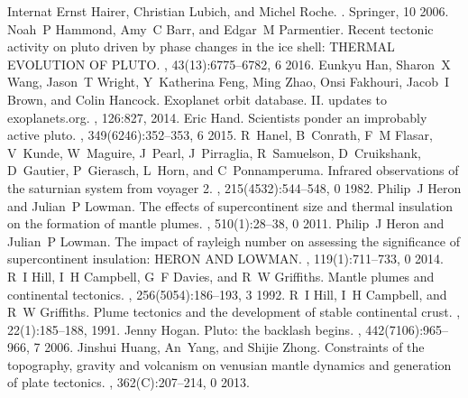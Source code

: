 \documentclass[letterpaper,10pt,english]{jupyterBook}
\begin{document}
\begin{sphinxthebibliography}{Internat}
\sphinxAtStartPar
Ernst Hairer, Christian Lubich, and Michel Roche. . Springer, 10 2006.
\sphinxAtStartPar
Noah P Hammond, Amy C Barr, and Edgar M Parmentier. Recent tectonic activity on pluto driven by phase changes in the ice shell: THERMAL EVOLUTION OF PLUTO. , 43(13):6775–6782, 6 2016.
\sphinxAtStartPar
Eunkyu Han, Sharon X Wang, Jason T Wright, Y Katherina Feng, Ming Zhao, Onsi Fakhouri, Jacob I Brown, and Colin Hancock. Exoplanet orbit database. II. updates to exoplanets.org. , 126:827, 2014.
\sphinxAtStartPar
Eric Hand. Scientists ponder an improbably active pluto. , 349(6246):352–353, 6 2015.
\sphinxAtStartPar
R Hanel, B Conrath, F M Flasar, V Kunde, W Maguire, J Pearl, J Pirraglia, R Samuelson, D Cruikshank, D Gautier, P Gierasch, L Horn, and C Ponnamperuma. Infrared observations of the saturnian system from voyager 2. , 215(4532):544–548, 0 1982.
\sphinxAtStartPar
Philip J Heron and Julian P Lowman. The effects of supercontinent size and thermal insulation on the formation of mantle plumes. , 510(1):28–38, 0 2011.
\sphinxAtStartPar
Philip J Heron and Julian P Lowman. The impact of rayleigh number on assessing the significance of supercontinent insulation: HERON AND LOWMAN. , 119(1):711–733, 0 2014.
\sphinxAtStartPar
R I Hill, I H Campbell, G F Davies, and R W Griffiths. Mantle plumes and continental tectonics. , 256(5054):186–193, 3 1992.
\sphinxAtStartPar
R I Hill, I H Campbell, and R W Griffiths. Plume tectonics and the development of stable continental crust. , 22(1):185–188, 1991.
\sphinxAtStartPar
Jenny Hogan. Pluto: the backlash begins. , 442(7106):965–966, 7 2006.
\sphinxAtStartPar
Jinshui Huang, An Yang, and Shijie Zhong. Constraints of the topography, gravity and volcanism on venusian mantle dynamics and generation of plate tectonics. , 362(C):207–214, 0 2013.

\end{sphinxthebibliography}
\end{document}
